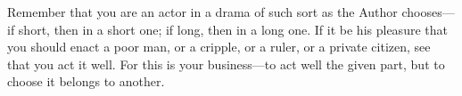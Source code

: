 Remember that you are an actor in a drama of such sort as the Author
chooses---if short, then in a short one; if long, then in a long one. If it
be his pleasure that you should enact a poor man, or a cripple, or a
ruler, or a private citizen, see that you act it well. For this is your
business---to act well the given part, but to choose it belongs to another.
